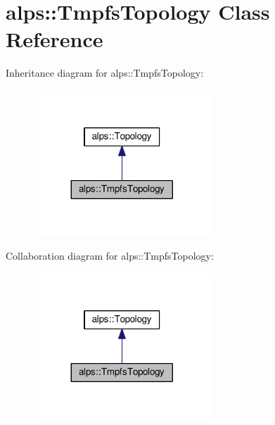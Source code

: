 \hypertarget{classalps_1_1TmpfsTopology}{}\section{alps\+:\+:Tmpfs\+Topology Class Reference}
\label{classalps_1_1TmpfsTopology}


Inheritance diagram for alps\+:\+:Tmpfs\+Topology\+:
\nopagebreak
\begin{figure}[H]
\begin{center}
\leavevmode
\includegraphics[width=188pt]{classalps_1_1TmpfsTopology__inherit__graph}
\end{center}
\end{figure}


Collaboration diagram for alps\+:\+:Tmpfs\+Topology\+:
\nopagebreak
\begin{figure}[H]
\begin{center}
\leavevmode
\includegraphics[width=188pt]{classalps_1_1TmpfsTopology__coll__graph}
\end{center}
\end{figure}
